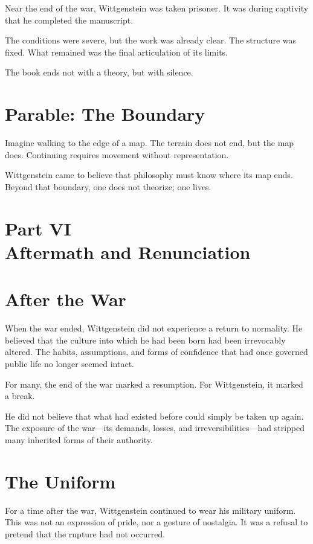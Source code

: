 \documentclass[11pt]{article}
\begin{document}
Near the end of the war, Wittgenstein was taken prisoner. It was during captivity that he completed the manuscript.

The conditions were severe, but the work was already clear. The structure was fixed. What remained was the final articulation of its limits.

The book ends not with a theory, but with silence.

\section*{Parable: The Boundary}

Imagine walking to the edge of a map. The terrain does not end, but the map does. Continuing requires movement without representation.

Wittgenstein came to believe that philosophy must know where its map ends. Beyond that boundary, one does not theorize; one lives.

\newpage
\section*{Part VI \\ Aftermath and Renunciation}

\section*{After the War}

When the war ended, Wittgenstein did not experience a return to normality. He believed that the culture into which he had been born had been irrevocably altered. The habits, assumptions, and forms of confidence that had once governed public life no longer seemed intact.

For many, the end of the war marked a resumption. For Wittgenstein, it marked a break.

He did not believe that what had existed before could simply be taken up again. The exposure of the war—its demands, losses, and irreversibilities—had stripped many inherited forms of their authority.

\section*{The Uniform}

For a time after the war, Wittgenstein continued to wear his military uniform. This was not an expression of pride, nor a gesture of nostalgia. It was a refusal to pretend that the rupture had not occurred.
\end{document}
